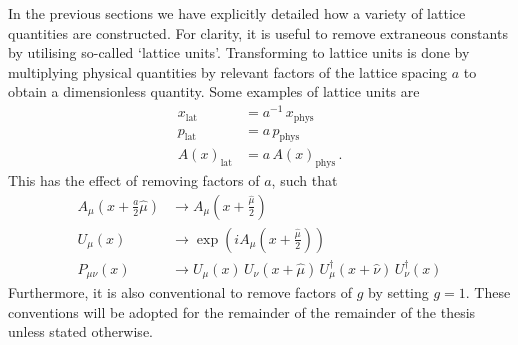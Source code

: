 In the previous sections we have explicitly detailed how a variety of lattice quantities are constructed. For clarity, it is useful to remove extraneous constants by utilising so-called `lattice units'. Transforming to lattice units is done by multiplying physical quantities by relevant factors of the lattice spacing $a$ to obtain a dimensionless quantity. Some examples of lattice units are
%
\begin{align*}
x_\text{lat} &= a^{-1}\,x_\text{phys}\\
p_\text{lat} &= a\, p_\text{phys}\\
A(x)_\text{lat} &= a\, A(x)_\text{phys}\, .
\end{align*}
%
This has the effect of removing factors of $a$, such that
%
\begin{align*}
A_\mu \left( x+\frac{a}{2}\hat{\mu} \right)&\rightarrow A_\mu \left(x+\frac{\hat{\mu}}{2} \right)\\
U_\mu(x) &\rightarrow \exp\left( i A_\mu \left(x+\frac{\hat{\mu}}{2}\right)\right)\\
P_{\mu\nu}(x) &\rightarrow U_\mu(x)\,U_\nu(x+\hat{\mu})\, U_\mu^\dag(x+\hat{\nu})\, U_\nu^\dag(x)
\end{align*}
%
Furthermore, it is also conventional to remove factors of $g$ by setting $g=1$. These conventions will be adopted for the remainder of the remainder of the thesis unless stated otherwise. 

%
%
%
%
%
